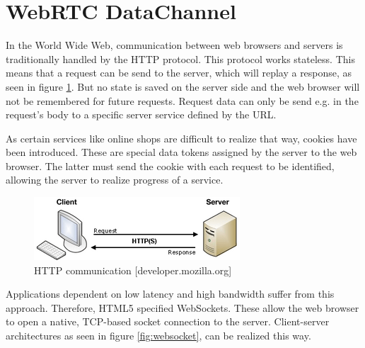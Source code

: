 \section{WebRTC DataChannel} \label{chapter_datachannel}

In the World Wide Web, communication between web browsers and servers is traditionally handled by the HTTP protocol. This protocol works stateless. This means that a request can be send to the server, which will replay a response, as seen in figure \ref{fig:http}. But no state is saved on the server side and the web browser will not be remembered for future requests. Request data can only be send e.g. in the request's body to a specific server service defined by the URL.

As certain services like online shops are difficult to realize that way, cookies have been introduced. These are special data tokens assigned by the server to the web browser. The latter must send the cookie with each request to be identified, allowing the server to realize progress of a service.

\begin{figure}[htp]
  \begin{center}
    \includegraphics[width=0.9\columnwidth]{resources/http.png}
  \end{center}
  \caption{HTTP communication [developer.mozilla.org]}
  \label{fig:http}
\end{figure}

Applications dependent on low latency and high bandwidth suffer from this approach. Therefore, HTML5 specified WebSockets. These allow the web browser to open a native, TCP-based socket connection to the server. Client-server architectures as seen in figure \ref{fig:websocket}, can be realized this way.

